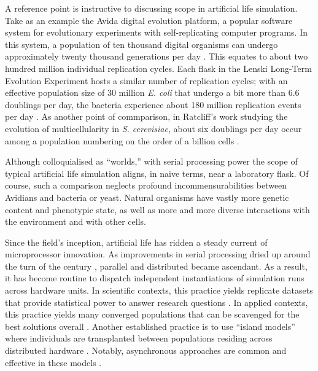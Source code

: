 A reference point is instructive to discussing scope in artificial life simulation.
Take as an example the Avida digital evolution platform, a popular software system for evolutionary experiments with self-replicating computer programs.
In this system, a population of ten thousand digital organisms can undergo approximately twenty thousand generations per day \citep{ofria2009artificial}.
This equates to about two hundred million individual replication cycles.
Each flask in the Lenski Long-Term Evolution Experiment hosts a similar number of replication cycles; with an effective population size of 30 million \textit{E. coli} that undergo a bit more than 6.6 doublings per day, the bacteria experience about 180 million replication events per day \citep{good2017dynamics}.
As another point of commparison, in Ratcliff’s work studying the evolution of multicellularity in \textit{S. cerevisiae}, about six doublings per day occur among a population numbering on the order of a billion cells \citep{ratcliff2012experimental}.

Although colloquialised as ``worlds,'' with serial processing power the scope of typical artificial life simulation aligns, in naive terms, near a laboratory flask.
Of course, such a comparison neglects profound incommensurabilities between Avidians and bacteria or yeast.
Natural organisms have vastly more genetic content and phenotypic state, as well as more and more diverse interactions with the environment and with other cells.

Since the field's inception, artificial life has ridden a steady current of microprocessor innovation.
As improvements in serial processing dried up around the turn of the century \citep{sutter2005free}, parallel and distributed became ascendant.
As a result, it has become routine to dispatch independent instantiations of simulation runs across hardware units.
In scientific contexts, this practice yields replicate datasets that provide statistical power to answer research questions \citep{dolson2017spatial}.
In applied contexts, this practice yields many converged populations that can be scavenged for the best solutions overall \citep{hornby2006automated}.
Another established practice is to use ``island models'' where individuals are transplanted between populations residing across distributed hardware \citep{gorges1990explicit}.
Notably, asynchronous approaches are common and effective in these models \citep{abdelhafez2019performance}.

